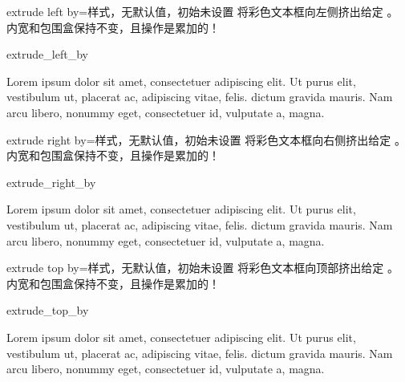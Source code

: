 \begin{docTcbKey}[][doc updated=2014-09-19]{extrude left by}{=}{样式，无默认值，初始未设置}
  将彩色文本框向左侧挤出给定 。
  内宽和包围盒保持不变，且操作是累加的！
\begin{exdispExample}{extrude_left_by}

Lorem ipsum dolor sit amet, consectetuer adipiscing elit. Ut purus elit,
vestibulum ut, placerat ac, adipiscing vitae, felis.
 dictum gravida mauris.
Nam arcu libero, nonummy eget, consectetuer id, vulputate a, magna.
\end{exdispExample}
\end{docTcbKey}

\begin{docTcbKey}[][doc updated=2014-09-19]{extrude right by}{=}{样式，无默认值，初始未设置}
  将彩色文本框向右侧挤出给定 。
  内宽和包围盒保持不变，且操作是累加的！
\begin{exdispExample}{extrude_right_by}

Lorem ipsum dolor sit amet, consectetuer adipiscing elit. Ut purus elit,
vestibulum ut, placerat ac, adipiscing vitae, felis.
 dictum gravida mauris.
Nam arcu libero, nonummy eget, consectetuer id, vulputate a, magna.
\end{exdispExample}
\end{docTcbKey}

\clearpage
\begin{docTcbKey}{extrude top by}{=}{样式，无默认值，初始未设置}
  将彩色文本框向顶部挤出给定 。
  内宽和包围盒保持不变，且操作是累加的！
\begin{exdispExample}{extrude_top_by}

Lorem ipsum dolor sit amet, consectetuer adipiscing elit. Ut purus elit,
vestibulum ut, placerat ac, adipiscing vitae, felis.
 dictum gravida mauris.
Nam arcu libero, nonummy eget, consectetuer id, vulputate a, magna.
\end{exdispExample}
\end{docTcbKey}

